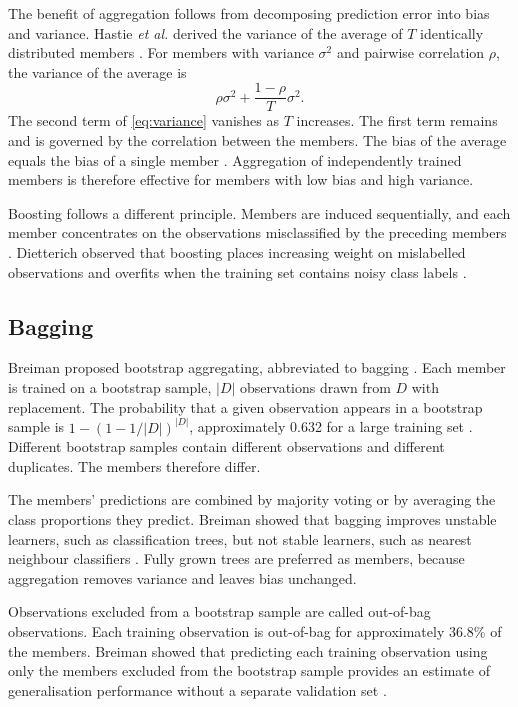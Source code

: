 \documentclass[conference]{IEEEtran}
\begin{document}
The benefit of aggregation follows from decomposing prediction error into bias and variance. Hastie \textit{et al.} derived the variance of the average of $T$ identically distributed members \cite{hastie}. For members with variance $\sigma^2$ and pairwise correlation $\rho$, the variance of the average is
\begin{equation}
\rho\sigma^2+\frac{1-\rho}{T}\sigma^2.
\label{eq:variance}
\end{equation}
The second term of \eqref{eq:variance} vanishes as $T$ increases. The first term remains and is governed by the correlation between the members. The bias of the average equals the bias of a single member \cite{hastie}. Aggregation of independently trained members is therefore effective for members with low bias and high variance.

Boosting follows a different principle. Members are induced sequentially, and each member concentrates on the observations misclassified by the preceding members \cite{dietterich2000}. Dietterich observed that boosting places increasing weight on mislabelled observations and overfits when the training set contains noisy class labels \cite{dietterich2000}.

\subsection{Bagging}

Breiman proposed bootstrap aggregating, abbreviated to bagging \cite{breiman1996}. Each member is trained on a bootstrap sample, $|D|$ observations drawn from $D$ with replacement. The probability that a given observation appears in a bootstrap sample is $1-(1-1/|D|)^{|D|}$, approximately 0.632 for a large training set \cite{hastie}. Different bootstrap samples contain different observations and different duplicates. The members therefore differ.

The members' predictions are combined by majority voting or by averaging the class proportions they predict. Breiman showed that bagging improves unstable learners, such as classification trees, but not stable learners, such as nearest neighbour classifiers \cite{breiman1996}. Fully grown trees are preferred as members, because aggregation removes variance and leaves bias unchanged.

Observations excluded from a bootstrap sample are called out-of-bag observations. Each training observation is out-of-bag for approximately 36.8\% of the members. Breiman showed that predicting each training observation using only the members excluded from the bootstrap sample provides an estimate of generalisation performance without a separate validation set \cite{breiman2001}.
\end{document}
